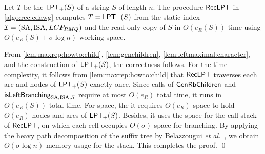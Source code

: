 \begin{lemmarep}\label{lem:main:from:lpt:to:cdawg:correct:time}
  Let $T$ be the $\mathsf{LPT}_{+}(S)$ of a string $S$ of length $n$. 
  The procedure $\textsf{RecLPT}$ in \cref{algo:rec:cdawg} computes $T = \mathsf{LPT}_{+}(S)$ from the static index $\mathcal{I} = (\mathrm{SA}, \mathrm{ISA}, LCP_{RMQ})$ and the read-only copy of $S$
  in $O(e_R(S))$ time
  using $O(e_R(S) + \sigma\log n)$ working space. 
\end{lemmarep}

\begin{proofsketch}
  From
\cref{lem:maxrep:howto:child},
\cref{lem:genchildren},
\cref{lem:leftmaximal:character},
and the construction of $\mathsf{LPT}_{+}(S)$, the correctness follows.
For the time complexity, it follows from \cref{lem:maxrep:howto:child} that $\textsf{RecLPT}$ traverses each arc and nodes of $\mathsf{LPT}_{+}(S)$ exactly once.
Since calls of $\textsf{GenRbChildren}_{}$ and $\mbox{\textsf{isLeftBranching}}_{{\mathrm{SA}, \mathrm{ISA}, S}}$ require at most $O(e_R)$ total time, it runs in $O(e_R(S))$ total time.
For space, the it requires $O(e_R)$ space to hold $O(e_R)$ nodes and arcs of $\mathsf{LPT}_{+}(S)$. Besides, it uses the space for the call stack of $\textsf{RecLPT}$, on which each cell occupies $O(\sigma)$ space for branching.
By applying the heavy path decomposition of the suffix tree by Belazzougui \textit{et al.}~\cite{belazzougui2020linear}, we obtain $O(\sigma \log n)$ memory usage for the stack. This completes the proof.
\qed
\end{proofsketch}

